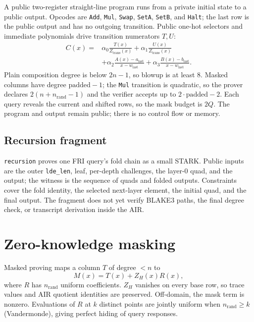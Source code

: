 \documentclass[11pt,a4paper]{article}
\begin{document}
A public two-register straight-line program runs from a private initial state
to a public output. Opcodes are \texttt{Add}, \texttt{Mul}, \texttt{Swap},
\texttt{SetA}, \texttt{SetB}, and \texttt{Halt}; the last row is the public
output and has no outgoing transition. Public one-hot selectors and immediate
polynomials drive transition numerators $T,U$:
\[
\begin{aligned}
C(x)={}&\alpha_0\frac{T(x)}{Z_{\mathrm{trans}}(x)}
+\alpha_1\frac{U(x)}{Z_{\mathrm{trans}}(x)}\\
&+\alpha_2\frac{A(x)-a_{\mathrm{last}}}{x-w_{\mathrm{last}}}
+\alpha_3\frac{B(x)-b_{\mathrm{last}}}{x-w_{\mathrm{last}}}.
\end{aligned}
\]
Plain composition degree is below $2n-1$, so blowup is at least 8. Masked
columns have degree $\mathrm{padded}-1$; the \texttt{Mul} transition is
quadratic, so the prover declares $2(n+n_{\mathrm{rand}}-1)$ and the verifier
accepts up to $2\cdot\mathrm{padded}-2$. Each query reveals the current and
shifted rows, so the mask budget is $2Q$. The program and output remain
public; there is no control flow or memory.

\subsection{Recursion fragment}

\texttt{recursion} proves one FRI query's fold chain as a small STARK. Public
inputs are the outer \texttt{lde\_len}, leaf, per-depth challenges, the
layer-0 quad, and the output; the witness is the sequence of quads and folded
outputs. Constraints cover the fold identity, the selected next-layer
element, the initial quad, and the final output. The fragment does not yet
verify BLAKE3 paths, the final degree check, or transcript derivation inside
the AIR.

\section{Zero-knowledge masking}

Masked proving maps a column $T$ of degree $<n$ to
\[
M(x)=T(x)+Z_H(x)R(x),
\]
where $R$ has $n_{\mathrm{rand}}$ uniform coefficients. $Z_H$ vanishes on
every base row, so trace values and AIR quotient identities are preserved.
Off-domain, the mask term is nonzero. Evaluations of $R$ at $k$ distinct
points are jointly uniform when $n_{\mathrm{rand}}\ge k$
(Vandermonde), giving perfect hiding of query responses.
\end{document}

